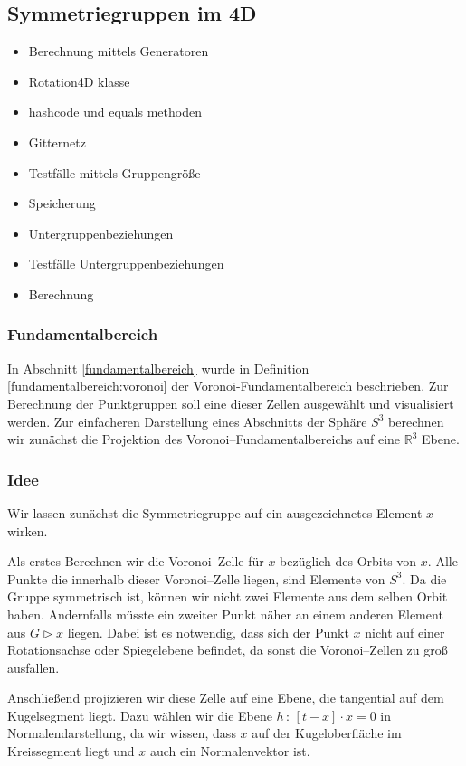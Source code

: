 \subsection{Symmetriegruppen im 4D}
\begin{itemize}
	\item Berechnung mittels Generatoren
	\item Rotation4D klasse
	\item hashcode und equals methoden
	\item Gitternetz
	\item Testfälle mittels Gruppengröße
	\item Speicherung
	\item Untergruppenbeziehungen
	\item Testfälle Untergruppenbeziehungen
	\item Berechnung
\end{itemize}


    \subsubsection{Fundamentalbereich}
         In Abschnitt \ref{fundamentalbereich} wurde in Definition \ref{fundamentalbereich:voronoi} der Voronoi-Fundamentalbereich beschrieben. Zur Berechnung der Punktgruppen soll eine dieser Zellen ausgewählt und visualisiert werden.
         Zur einfacheren Darstellung eines Abschnitts der Sphäre $S^3$ berechnen wir zunächst die Projektion des Voronoi--Fundamentalbereichs auf eine $\mathbb{R}^3$ Ebene.
        \subsubsection*{Idee}
            Wir lassen zunächst die Symmetriegruppe auf ein ausgezeichnetes Element $x$ wirken.

            \noindent Als erstes Berechnen wir die Voronoi--Zelle für $x$ bezüglich des Orbits von $x$. Alle Punkte die innerhalb dieser Voronoi--Zelle liegen, sind Elemente von $S^3$. 
            Da die Gruppe symmetrisch ist, können wir nicht zwei Elemente aus dem selben Orbit haben. 
            Andernfalls müsste ein zweiter Punkt näher an einem anderen Element aus $G \rhd x$ liegen.
            Dabei ist es notwendig, dass sich der Punkt $x$ nicht auf einer Rotationsachse oder Spiegelebene befindet, da sonst die Voronoi--Zellen zu groß ausfallen.
            
            Anschließend projizieren wir diese Zelle auf eine Ebene, die tangential auf dem Kugelsegment liegt. Dazu wählen wir die Ebene $h \, : \, [t - x] \cdot x = 0$ in Normalendarstellung, da wir wissen, dass $x$ auf der Kugeloberfläche im Kreissegment liegt und $x$ auch ein Normalenvektor ist.
            
